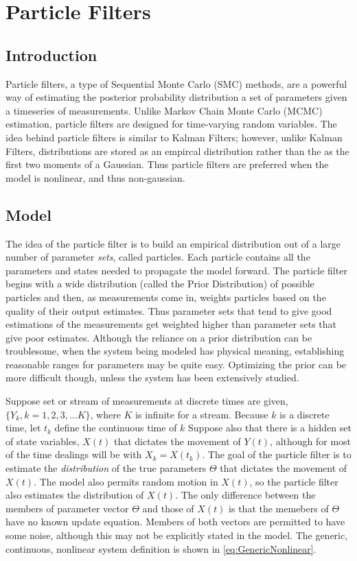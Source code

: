 \chapter{Particle Filters}
\label{sec:Particle Filter}
\section{Introduction}
Particle filters, a type of Sequential Monte Carlo (SMC) methods,
are a powerful way of estimating the posterior probability distribution
a set of parameters given a timeseries of measurements. Unlike Markov 
Chain Monte Carlo (MCMC) estimation, particle filters are designed for 
time-varying random variables. The idea behind particle filters is
similar to Kalman Filters; however, unlike Kalman Filters,
distributions are stored as an empircal distribution rather than the
as the first two moments of a Gaussian. Thus particle filters are 
preferred when the model is nonlinear, and thus non-gaussian.

\section{Model}
\label{sec:Particle Filter Model}
The idea of the particle filter is to build an empirical distribution
out of a large number of parameter \emph{sets}, called particles. Each
particle contains all the parameters and states needed to propagate
the model forward.  The particle filter begins with a wide distribution 
(called the Prior Distribution)
of possible particles and then, as measurements come in, weights 
particles based on the quality of their output estimates. Thus parameter sets 
that tend to give good estimations of the measurements get weighted higher
than parameter sets that give poor estimates. Although the reliance on
a prior distribution can be troublesome, when the system being modeled
has physical meaning, establishing reasonable ranges for parameters may be 
quite easy. Optimizing the prior can be more difficult though,
unless the system has been extensively studied.

Suppose set or stream of measurements at discrete times are given, 
$\{Y_k, k = 1, 2, 3, ... K\}$, where $K$ is infinite for a stream. 
Because $k$ is a discrete time, let $t_k$ define the continuous
time of $k$
Suppose also that there is a hidden set of state variables,
$X(t)$ that dictates the movement
of $Y(t)$, although for most of the time dealings will be
with $X_k = X(t_k)$. The goal of the particle filter is to estimate the 
\emph{distribution} of the
true parameters $\Theta$ that dictates the movement of $X(t)$.
The model also permits random motion in $X(t)$, so the 
particle filter also estimates the distribution of $X(t)$.
The only difference between the members of parameter vector
$\Theta$ and those of $X(t)$ is that the memebers of
$\Theta$ have no known update equation. Members of both vectors
are permitted to have some noise, although this
may not be explicitly stated in the model. The generic, continuous, nonlinear
system definition is shown in \autoref{eq:GenericNonlinear}.

